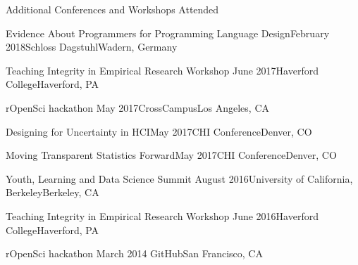 \documentclass{resume} %
\begin{document}
\begin{rSection}{Additional Conferences and Workshops Attended}

\begin{sSubsection}{Evidence About Programmers for Programming Language Design}{}{February 2018}{Schloss Dagstuhl}{Wadern, Germany}
\end{sSubsection}

\begin{sSubsection}{Teaching Integrity in Empirical Research Workshop}{ }{June 2017}{Haverford College}{Haverford, PA}
\end{sSubsection}

\begin{sSubsection}{rOpenSci hackathon}{ }{May 2017}{CrossCampus}{Los Angeles, CA}
\end{sSubsection}

\begin{sSubsection}{Designing for Uncertainty in HCI}{}{May 2017}{CHI Conference}{Denver, CO}
\end{sSubsection}

\begin{sSubsection}{Moving Transparent Statistics Forward}{}{May 2017}{CHI Conference}{Denver, CO}
\end{sSubsection}

\begin{sSubsection}{Youth, Learning and Data Science Summit}{ }{August 2016}{University of California, Berkeley}{Berkeley, CA}
\end{sSubsection}

\begin{sSubsection}{Teaching Integrity in Empirical Research Workshop}{ }{June 2016}{Haverford College}{Haverford, PA}
\end{sSubsection}

\begin{sSubsection}{rOpenSci hackathon}{ }{March 2014}{ GitHub}{San Francisco, CA}
\end{sSubsection}


\end{rSection}

\end{document}
